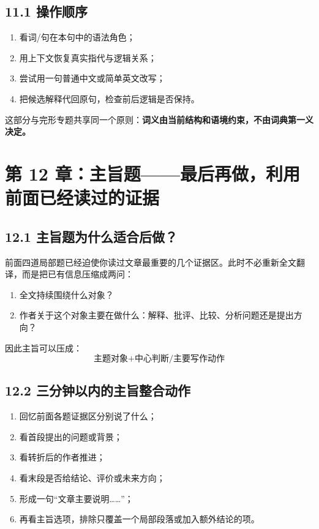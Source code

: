\documentclass[11pt,a4paper]{ctexart}
\newcommand{\kw}[1]{\textbf{#1}}
\begin{document}
\subsection{11.1 操作顺序}
\begin{enumerate}
  \item 看词/句在本句中的语法角色；
  \item 用上下文恢复真实指代与逻辑关系；
  \item 尝试用一句普通中文或简单英文改写；
  \item 把候选解释代回原句，检查前后逻辑是否保持。
\end{enumerate}

这部分与完形专题共享同一个原则：\kw{词义由当前结构和语境约束，不由词典第一义决定。}

\section{第 12 章：主旨题——最后再做，利用前面已经读过的证据}

\subsection{12.1 主旨题为什么适合后做？}
前面四道局部题已经迫使你读过文章最重要的几个证据区。此时不必重新全文翻译，而是把已有信息压缩成两问：
\begin{enumerate}
  \item 全文持续围绕什么对象？
  \item 作者关于这个对象主要在做什么：解释、批评、比较、分析问题还是提出方向？
\end{enumerate}

因此主旨可以压成：
\[
\boxed{
\text{主题对象}
+
\text{中心判断/主要写作动作}
}
\]

\subsection{12.2 三分钟以内的主旨整合动作}
\begin{enumerate}
  \item 回忆前面各题证据区分别说了什么；
  \item 看首段提出的问题或背景；
  \item 看转折后的作者推进；
  \item 看末段是否给结论、评价或未来方向；
  \item 形成一句“文章主要说明……”；
  \item 再看主旨选项，排除只覆盖一个局部段落或加入额外结论的项。
\end{enumerate}
\end{document}
